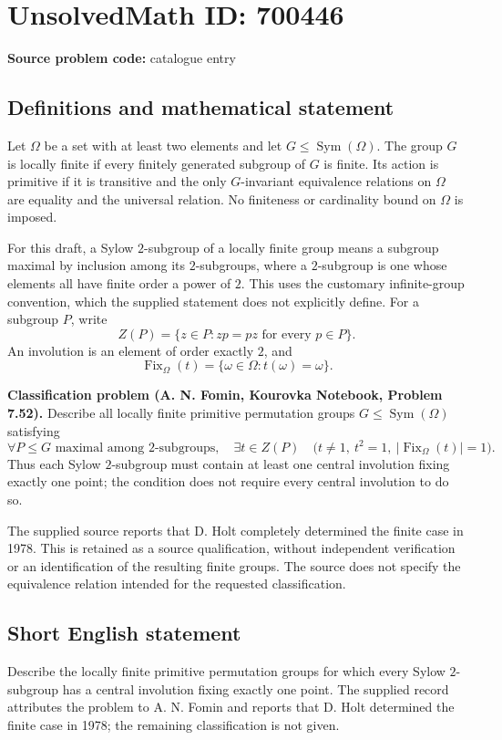 \documentclass[11pt]{article}
\begin{document}
\section*{UnsolvedMath ID: 700446}
\textbf{Source problem code:} catalogue entry
\subsection{Definitions and mathematical statement}
Let \(\Omega\) be a set with at least two elements and let \(G\leq\operatorname{Sym}(\Omega)\). The group \(G\) is locally finite if every finitely generated subgroup of \(G\) is finite. Its action is primitive if it is transitive and the only \(G\)-invariant equivalence relations on \(\Omega\) are equality and the universal relation. No finiteness or cardinality bound on \(\Omega\) is imposed.

For this draft, a Sylow \(2\)-subgroup of a locally finite group means a subgroup maximal by inclusion among its \(2\)-subgroups, where a \(2\)-subgroup is one whose elements all have finite order a power of \(2\). This uses the customary infinite-group convention, which the supplied statement does not explicitly define. For a subgroup \(P\), write
\[
Z(P)=\{z\in P:zp=pz\text{ for every }p\in P\}.
\]
An involution is an element of order exactly \(2\), and
\[
\operatorname{Fix}_{\Omega}(t)=\{\omega\in\Omega:t(\omega)=\omega\}.
\]

\textbf{Classification problem (A. N. Fomin, Kourovka Notebook, Problem 7.52).} Describe all locally finite primitive permutation groups \(G\leq\operatorname{Sym}(\Omega)\) satisfying
\[
\forall P\leq G\text{ maximal among }2\text{-subgroups},\quad
\exists t\in Z(P)\quad
\bigl(t\neq 1,\ t^2=1,\ |\operatorname{Fix}_{\Omega}(t)|=1\bigr).
\]
Thus each Sylow \(2\)-subgroup must contain at least one central involution fixing exactly one point; the condition does not require every central involution to do so.

The supplied source reports that D. Holt completely determined the finite case in 1978. This is retained as a source qualification, without independent verification or an identification of the resulting finite groups. The source does not specify the equivalence relation intended for the requested classification.
\subsection{Short English statement}
Describe the locally finite primitive permutation groups for which every Sylow \(2\)-subgroup has a central involution fixing exactly one point. The supplied record attributes the problem to A. N. Fomin and reports that D. Holt determined the finite case in 1978; the remaining classification is not given.
\end{document}

